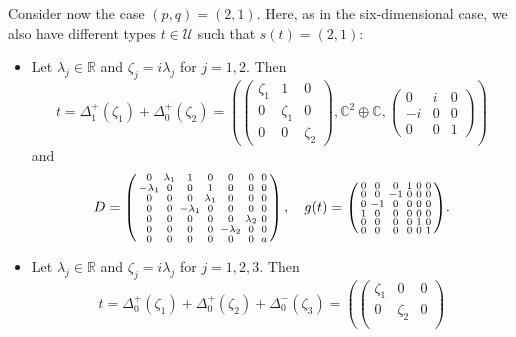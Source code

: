 \documentclass{article}
\theoremstyle{definition}
\newcommand{\R}{\mathbb{R}}
\newcommand{\C}{\mathbb{C}}
\newenvironment{smallpmatrix}{\left(\begin{smallmatrix}}{\end{smallmatrix}\right)}
\begin{document}
Consider now the case $(p,q)=(2,1)$. Here, as in the six-dimensional case, we also have different types $t\in\mathcal{U}$ such that $s(t)=(2,1)$: \begin{itemize}
    \item Let $\lambda_j\in\R$ and $\zeta_j=i\lambda_j$ for $j=1,2$. Then $$t=\Delta_1^+(\zeta_1)+\Delta_0^+(\zeta_2)=\left(\begin{pmatrix}
        \zeta_1&1&0\\
        0&\zeta_1&0\\
        0&0&\zeta_2
    \end{pmatrix},\C^2\oplus\C,\begin{pmatrix}
        0&i&0\\
        -i&0&0\\
        0&0&1
    \end{pmatrix}\right)$$ and \begin{equation}\label{8d_noniso_(2,1)-I}
        D=\left(\begin{smallmatrix}
        0 & \lambda_{1} & 1 & 0 & 0 & 0 & 0 \\
        -\lambda_{1} & 0 & 0 & 1 & 0 & 0 & 0 \\
        0 & 0 & 0 & \lambda_{1} & 0 & 0 & 0 \\
        0 & 0 & -\lambda_{1} & 0 & 0 & 0 & 0 \\
        0 & 0 & 0 & 0 & 0 & \lambda_{2} & 0 \\
        0 & 0 & 0 & 0 & -\lambda_{2} & 0 & 0 \\
        0 & 0 & 0 & 0 & 0 & 0 & a
    \end{smallmatrix}\right),\quad g(t)=\begin{smallpmatrix}
        0 & 0 & 0 & 1 & 0 & 0 \\
        0 & 0 & -1 & 0 & 0 & 0 \\
        0 & -1 & 0 & 0 & 0 & 0 \\
        1 & 0 & 0 & 0 & 0 & 0 \\
        0 & 0 & 0 & 0 & 1 & 0 \\
        0 & 0 & 0 & 0 & 0 & 1
    \end{smallpmatrix}.\end{equation}
    \item Let $\lambda_j\in\R$ and $\zeta_j=i\lambda_j$ for $j=1,2,3$. Then $$t=\Delta_0^+(\zeta_1)+\Delta_0^+(\zeta_2)+\Delta_0^-(\zeta_3)=\left(\begin{pmatrix}
        \zeta_1&0&0\\
        0&\zeta_2&0\\

\end{pmatrix}$$
\end{itemize}
\end{document}
